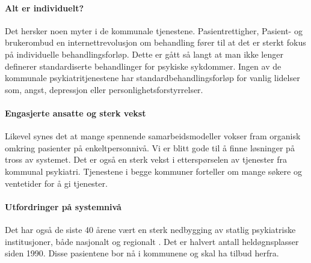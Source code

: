 \documentclass[11pt]{report} %
\begin{document}
                  \paragraph{Alt er individuelt?\\}
                    Det hersker noen myter i de kommunale tjenestene. Pasientrettigher, Pasient- og brukerombud en internettrevolusjon om behandling fører til at det er sterkt fokus på individuelle behandlingsforløp. Dette er gått så langt at man ikke lenger definerer standardiserte behandlinger for psykiske sykdommer. Ingen av de kommunale psykiatritjenestene har standardbehandlingsforløp for vanlig lidelser som, angst, depressjon eller personlighetsforstyrrelser.
                  \paragraph{Engasjerte ansatte og sterk vekst\\}
                    Likevel synes det at mange spennende samarbeidsmodeller vokser fram organisk omkring pasienter på enkeltpersonnivå. Vi er blitt gode til å finne løsninger på tross av systemet. Det er også en sterk vekst i etterspørselen av tjenester fra kommunal psykiatri. Tjenestene i begge kommuner forteller om mange søkere og ventetider for å gi tjenester.
                  \paragraph{Utfordringer på systemnivå\\}  
                    Det har også de siste 40 årene vært en sterk nedbygging av statlig psykiatriske institusjoner, både nasjonalt og regionalt
                    \cite{SSButtrekk1}. Det er halvert antall heldøgnsplasser siden 1990. Disse pasientene bor nå i kommunene og skal ha tilbud herfra. 
\end{document}

